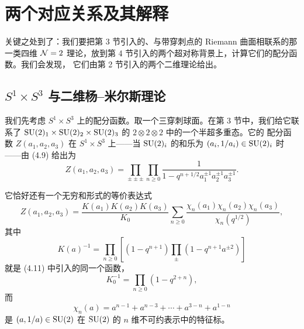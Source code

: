 
\section{两个对应关系及其解释}

关键之处到了：我们要把第 3 节引入的、与带穿刺点的 Riemann 曲面相联系的那一类四维
$\mathcal{N}=2$ 理论，放到第 4 节引入的两个超对称背景上，计算它们的配分函数。我们会发现，
它们由第 2 节引入的两个二维理论给出。

\subsection{$S^1\times S^3$ 与二维杨--米尔斯理论}

我们先考虑 $S^1\times S^3$ 上的配分函数。取一个三穿刺球面。在第 3 节中，我们给它联系了
$\mathrm{SU}(2)_1\times\mathrm{SU}(2)_2\times\mathrm{SU}(2)_3$ 的 $2\otimes2\otimes2$ 中的一个半超多重态。它的%
配分函数 $Z(a_1,a_2,a_3)$ 在 $S^1\times S^3$ 上——当 $\mathrm{SU}(2)_i$ 的和乐为
$(a_i,1/a_i)\in\mathrm{SU}(2)_i$ 时——由 (4.9) 给出为
\begin{equation}
Z(a_1,a_2,a_3)=\prod_{\pm\pm\pm}\prod_{n\ge0}\frac{1}{1-q^{n+1/2}a_1^{\pm1}a_2^{\pm1}a_3^{\pm1}}.
\tag{5.1}
\end{equation}


它恰好还有一个无穷和形式的等价表达式
\begin{equation}
Z(a_1,a_2,a_3)=\frac{K(a_1)K(a_2)K(a_3)}{K_0}\sum_{n\ge0}
\frac{\chi_n(a_1)\chi_n(a_2)\chi_n(a_3)}{\chi_n(q^{1/2})},
\tag{5.2}
\end{equation}
其中
\begin{equation}
K(a)^{-1}=\prod_{n\ge0}\left[(1-q^{n+1})\prod_{\pm}(1-q^{n+1}a^{\pm2})\right]
\tag{5.3}
\end{equation}
就是 (4.11) 中引入的同一个函数，
\begin{equation}
K_0^{-1}=\prod_{n\ge0}(1-q^{2+n}),
\tag{5.4}
\end{equation}
而
\begin{equation}
\chi_n(a)=a^{n-1}+a^{n-3}+\cdots+a^{3-n}+a^{1-n}
\tag{5.5}
\end{equation}
是 $(a,1/a)\in\mathrm{SU}(2)$ 在 $\mathrm{SU}(2)$ 的 $n$ 维不可约表示中的特征标。

